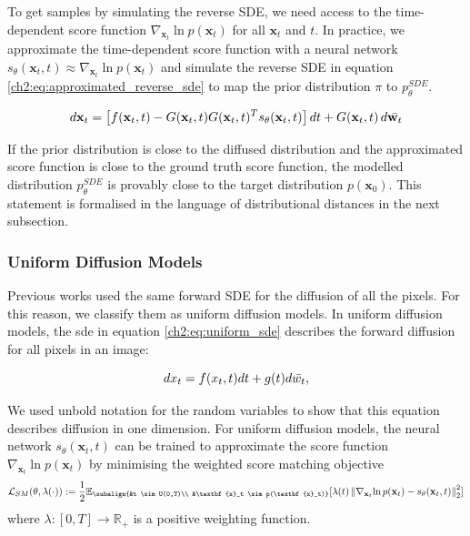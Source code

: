 To get samples by simulating the reverse SDE, we need access to the time-dependent score function $\nabla_{\textbf{x}_t}{\ln{p(\textbf{x}_t)}}$ for all $\textbf{x}_t$ and $t$. In practice, we approximate the time-dependent score function with a neural network $s_{\theta}(\textbf{x}_t,t) \approx \nabla_{\textbf{x}_t}{\ln{p(\textbf{x}_t)}}$ and simulate the reverse SDE in equation \ref{ch2:eq:approximated_reverse_sde} to map the prior distribution $\pi$ to $p^{SDE}_{\theta}$.

\begin{equation}
    \label{ch2:eq:approximated_reverse_sde}
    d\mathbf{x}_t = \left[ f(\mathbf{x}_t, t) - G(\mathbf{x}_t, t) G(\mathbf{x}_t, t)^T s_{\theta}(\mathbf{x}_t, t) \right] dt + G(\mathbf{x}_t, t) \, d\Bar{\mathbf{w}_t}
\end{equation}

If the prior distribution is close to the diffused distribution and the approximated score function is close to the ground truth score function, the modelled distribution  $p^{SDE}_{\theta}$ is provably close to the target distribution $p(\textbf{x}_0)$. This statement is formalised in the language of distributional distances in the next subsection.

\subsubsection{Uniform Diffusion Models}
Previous works \cite{ho2020denoising, song2020generative_score, dhariwal2021diffusion_beats_gans} used the same forward SDE for the diffusion of all the pixels. For this reason, we classify them as uniform diffusion models. In uniform diffusion models, the sde in equation \ref{ch2:eq:uniform_sde} describes the forward diffusion for all pixels in an image:

\begin{equation}\label{ch2:eq:uniform_sde}
dx_t=f(x_t,t)dt + g(t)d\Bar{w_t},
\end{equation}

We used unbold notation for the random variables to show that this equation describes diffusion in one dimension. For uniform diffusion models, the neural network $s_\theta(\textbf{x}_t,t)$ can be trained to approximate the score function $\nabla_{\textbf{x}_t}{\ln{p(\textbf{x}_t)}}$ by minimising the weighted score matching objective
\begin{gather}
    \mathcal{L}_{SM}(\theta, \lambda(\cdot)) := \frac{1}{2} \mathbb{E}_{\subalign{&t \sim U(0,T)\\ &\textbf{x}_t \sim p(\textbf{x}_t)}} [\lambda(t) \norm{\nabla_{\textbf{x}_t}{\ln{p(\textbf{x}_t)}} - s_\theta(\textbf{x}_t,t)}_2^2]
\end{gather}
where $\lambda: [0,T] \xrightarrow{} \mathbb{R}_+$ is a positive weighting function.

